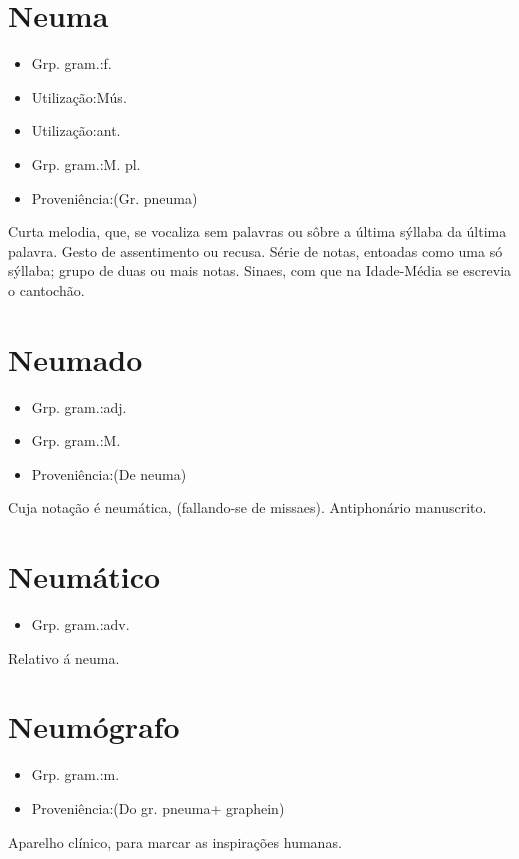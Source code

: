 \section{Neuma}
\begin{itemize}
\item {Grp. gram.:f.}
\end{itemize}
\begin{itemize}
\item {Utilização:Mús.}
\end{itemize}
\begin{itemize}
\item {Utilização:ant.}
\end{itemize}
\begin{itemize}
\item {Grp. gram.:M. pl.}
\end{itemize}
\begin{itemize}
\item {Proveniência:(Gr. \textunderscore pneuma\textunderscore )}
\end{itemize}
Curta melodia, que, se vocaliza sem palavras ou sôbre a última sýllaba da última palavra.
Gesto de assentimento ou recusa.
Série de notas, entoadas como uma só sýllaba; grupo de duas ou mais notas.
Sinaes, com que na Idade-Média se escrevia o cantochão.
\section{Neumado}
\begin{itemize}
\item {Grp. gram.:adj.}
\end{itemize}
\begin{itemize}
\item {Grp. gram.:M.}
\end{itemize}
\begin{itemize}
\item {Proveniência:(De \textunderscore neuma\textunderscore )}
\end{itemize}
Cuja notação é neumática, (fallando-se de missaes).
Antiphonário manuscrito.
\section{Neumático}
\begin{itemize}
\item {Grp. gram.:adv.}
\end{itemize}
Relativo á neuma.
\section{Neumógrafo}
\begin{itemize}
\item {Grp. gram.:m.}
\end{itemize}
\begin{itemize}
\item {Proveniência:(Do gr. \textunderscore pneuma\textunderscore  + \textunderscore graphein\textunderscore )}
\end{itemize}
Aparelho clínico, para marcar as inspirações humanas.
